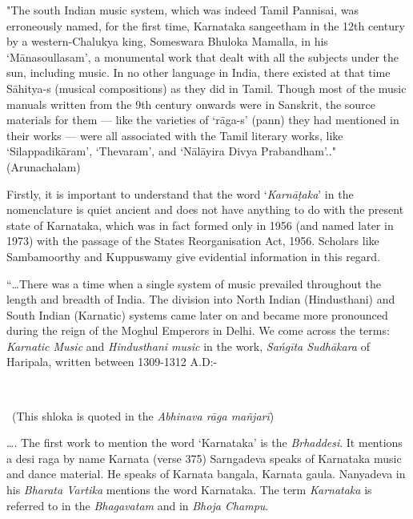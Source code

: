 \begin{myquote}
"The south Indian music system, which was indeed Tamil Pannisai, was erroneously named, for the first time, Karnataka sangeetham in the 12th century by a western-Chalukya king, Someswara Bhuloka Mamalla, in his ‘Mānasoullasam', a monumental work that dealt with all the subjects under the sun, including music. In no other language in India, there existed at that time Sāhitya-s (musical compositions) as they did in Tamil. Though most of the music manuals written from the 9th century onwards were in Sanskrit, the source materials for them — like the varieties of ‘rāga-s' (pann) they had mentioned in their works — were all associated with the Tamil literary works, like ‘Silappadikāram', ‘Thevaram', and ‘Nālāyira Divya Prabandham'.."\hfill (Arunachalam)
\end{myquote}

Firstly, it is important to understand that the word ‘\textit{Karnāṭaka}’ in the nomenclature is quiet ancient and does not have anything to do with the present state of Karnataka, which was in fact formed only in 1956 (and named later in 1973) with the passage of the States Reorganisation Act, 1956. Scholars like Sambamoorthy and Kuppuswamy give evidential information in this regard.

\newpage

\begin{myquote}
“…There was a time when a single system of music prevailed throughout the length and breadth of India. The division into North Indian (Hindusthani) and South Indian (Karnatic) systems came later on and became more pronounced during the reign of the Moghul Emperors in Delhi. We come across the terms: \textit{Karnatic Music} and \textit{Hindusthani music} in the work, \textit{Sańgīta Sudhākara} of Haripala, written between 1309-1312 A.D:-
\end{myquote}

\begin{myquote}
\\

~\hfill (This shloka is quoted in the \textit{Abhinava rāga mañjarī})
\end{myquote}

\begin{myquote}
…. The first work to mention the word ‘Karnataka’ is the \textit{Brhaddesi}. It mentions a desi raga by name Karnata (verse 375) Sarngadeva speaks of Karnataka music and dance material. He speaks of Karnata bangala, Karnata gaula. Nanyadeva in his \textit{Bharata Vartika} mentions the word Karnataka. The term \textit{Karnataka} is referred to in the \textit{Bhagavatam} and in \textit{Bhoja Champu}.
\end{myquote}

